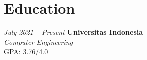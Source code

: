 \documentclass[../main.tex]{subfiles}
\begin{document}
\section{Education}

\begin{twocolentry}{
		\small
		\textit{July 2021 – Present}}
	\textbf{Universitas Indonesia} \\
	\textit{Computer Engineering} \\
	GPA: 3.76/4.0
\end{twocolentry}
\end{document}
